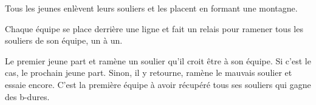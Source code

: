 \documentclass{grand-jeu}
\begin{document}
\begin{regles}
Tous les jeunes enlèvent leurs souliers et les placent en formant une montagne. 

Chaque équipe se place derrière une ligne et fait un relais pour ramener tous les souliers de son équipe, un à un.  

Le premier jeune part et ramène un soulier qu’il croit être à son équipe. 
Si c’est le cas, le prochain jeune part. Sinon, il y retourne, ramène le mauvais soulier et essaie encore.
C’est la première équipe à avoir récupéré tous ses souliers qui gagne des b-dures.
\end{regles}

\begin{imaginaire}

\end{imaginaire}

\begin{moments-stop}
\end{moments-stop}
\end{document}
